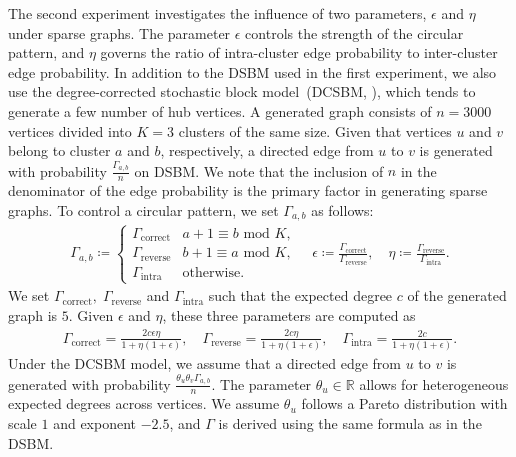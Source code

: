 \documentclass{article}
\theoremstyle{plain}
\begin{document}
The second experiment investigates the influence of two parameters, $\epsilon$ and $\eta$ under sparse graphs.
The parameter $\epsilon$ controls the strength of the circular pattern, and $\eta$ governs the ratio of intra-cluster edge probability to inter-cluster edge probability. In addition to the DSBM used in the first experiment, we also use the degree-corrected stochastic block model~(DCSBM, \citep{Karrer2011-ic}), which tends to generate a few number of hub vertices.
A generated graph consists of $n=3000$ vertices divided into $K=3$ clusters of the same size.
Given that vertices $u$ and $v$ belong to cluster $a$ and $b$, respectively, a directed edge from $u$ to $v$ is generated with probability $\frac{\Gamma_{a,b}}{n}$ on DSBM.
We note that the inclusion of $n$ in the denominator of the edge probability is the primary factor in generating sparse graphs.
To control a circular pattern, we set $\Gamma_{a,b}$ as follows:
\begin{align*}
	\Gamma_{a,b} \coloneqq \begin{cases}
		                       \Gamma_{\text{correct}} & a+1 \equiv b \text{ mod } K
		                       ,                                                     \\
		                       \Gamma_{\text{reverse}} & b+1 \equiv a \text{ mod } K
		                       ,                                                     \\
		                       \Gamma_{\text{intra}}   & \text{otherwise}
		                       .
	                       \end{cases}
	\quad
	\epsilon \coloneqq \frac{\Gamma_{\text{correct}}}{\Gamma_{\text{reverse}}}
	,\quad
	\eta \coloneqq \frac{\Gamma_{\text{reverse}}}{\Gamma_{\text{intra}}}
	.
\end{align*}
We set $\Gamma_{\text{correct}},\; \Gamma_{\text{reverse}}$ and $\Gamma_{\text{intra}}$ such that the expected degree $c$ of the generated graph is $5$.
Given $\epsilon$ and $\eta$, these three parameters are computed as
\begin{align*}
	\Gamma_{\text{correct}} = \frac{2c \epsilon \eta}{1 + \eta (1 + \epsilon)}
	,\quad
	\Gamma_{\text{reverse}} = \frac{2c \eta}{1 + \eta (1 + \epsilon)}
	,\quad
	\Gamma_{\text{intra}} = \frac{2c}{1 + \eta (1 + \epsilon)}
	.
\end{align*}
%
Under the DCSBM model, we assume that a directed edge from $u$ to $v$ is generated with probability $\frac{\theta_u \theta_v \Gamma_{a,b}}{n}$.
The parameter $\theta_u \in \mathbb{R}$ allows for heterogeneous expected degrees across vertices.
We assume $\theta_u$ follows a Pareto distribution with scale $1$ and exponent $-2.5$,
and $\Gamma$ is derived using the same formula as in the DSBM.
\end{document}
